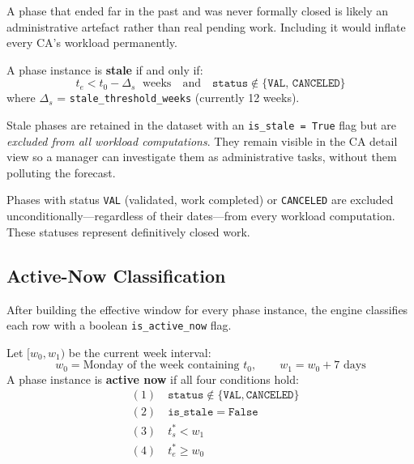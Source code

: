 \documentclass[12pt,a4paper]{report}
\begin{document}
A phase that ended far in the past and was never formally closed is
likely an administrative artefact rather than real pending work.
Including it would inflate every CA's workload permanently.

\begin{tcolorbox}[defbox, title={Definition: Stale Phase}]
A phase instance is \textbf{stale} if and only if:
\[
  t_e < t_0 - \Delta_s \;\text{ weeks}
  \quad \text{and} \quad
  \texttt{status} \notin \{\texttt{VAL},\, \texttt{CANCELED}\}
\]
where $\Delta_s$ = \texttt{stale\_threshold\_weeks} (currently 12 weeks).
\end{tcolorbox}

Stale phases are retained in the dataset with an \texttt{is\_stale = True}
flag but are \textit{excluded from all workload computations}.
They remain visible in the CA detail view so a manager can investigate
them as administrative tasks, without them polluting the forecast.

\begin{tcolorbox}[notebox, title={Note on VAL and CANCELED}]
Phases with status \texttt{VAL} (validated, work completed) or
\texttt{CANCELED} are excluded unconditionally---regardless of their
dates---from every workload computation. These statuses represent
definitively closed work.
\end{tcolorbox}

\subsection{Active-Now Classification}

After building the effective window for every phase instance, the engine
classifies each row with a boolean \texttt{is\_active\_now} flag.

\begin{tcolorbox}[defbox, title={Definition: Active-Now Phase}]
Let $[w_0, w_1)$ be the current week interval:
\[
  w_0 = \text{Monday of the week containing } t_0,
  \qquad
  w_1 = w_0 + 7 \text{ days}
\]
A phase instance is \textbf{active now} if all four conditions hold:
\begin{align*}
  &(1)\quad \texttt{status} \notin \{\texttt{VAL}, \texttt{CANCELED}\} \\
  &(2)\quad \texttt{is\_stale} = \texttt{False} \\
  &(3)\quad t_s^* < w_1 \\
  &(4)\quad t_e^* \geq w_0
\end{align*}
\end{tcolorbox}
\end{document}
